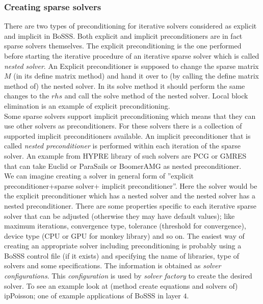 \documentclass[BoSSSForSolvingConservationLaws.tex]{subfiles}
\begin{document}
\subsubsection*{Creating sparse solvers}
There are two types of preconditioning for iterative solvers considered as explicit and implicit in BoSSS. Both explicit and implicit preconditioners are in fact sparse solvers themselves. The explicit preconditioning is the one performed before starting the iterative procedure of an iterative sparse solver which is called \emph{nested solver}. An Explicit preconditioner is supposed to change the sparse matrix $M$ (in its define matrix method) and hand it over to (by calling the define matrix method of) the nested solver. In its solve method it should perform the same changes to the $rhs$ and call the solve method of the nested solver. Local block elimination is an example of explicit preconditioning.\\
Some sparse solvers support implicit preconditioning which means that they can use other solvers as preconditioners. For these solvers there is a collection of supported implicit preconditioners available. An implicit preconditioner that is called \emph{nested preconditioner} is performed within each iteration of the sparse solver. An example from HYPRE library of such solvers are PCG or GMRES that can take Euclid or ParaSails or BoomerAMG as nested preconditioner.\\
We can imagine creating a solver in general form of ''explicit preconditioner+sparse solver+ implicit preconditioner''. Here the solver would be the explicit preconditioner which has a nested solver and the nested solver has a nested preconditioner. There are some properties specific to each iterative sparse solver that can be adjusted (otherwise they may have default values); like maximum iterations, convergence type, tolerance (threshold for convergence), device type (CPU or GPU for monkey library) and so on. The easiest way of creating an appropriate solver including preconditioning is probably using a BoSSS control file (if it exists) and specifying the name of libraries, type of solvers and some specifications. The information is obtained as \emph{solver configurations}. This \emph{configuration} is used by \emph{solver factory} to create the desired solver. To see an example look at (method create equations and solvers of) ipPoisson;  one of example applications of BoSSS in layer $4$.
\end{document}
